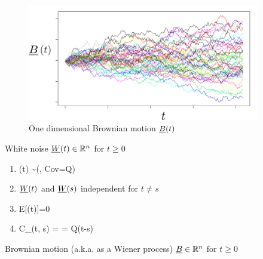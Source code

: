  \begin{figure}[h!]
  \centering
  \includegraphics[width=4in]
  {stochastic-diff-eqns/brownian-motion-labeled}
  \caption{One dimensional Brownian motion ${\underline{B}}(t)$}
  \label{fig-brownian-motion-t}
  \end{figure}
  
 

White noise ${\underline{W}}(t)
\in{ \mathbb{R}}^n$ for $t\geq 0$

\begin{enumerate}
\item
\beq
\rvW(t) \sim \caln(, Cov=Q)
\eeq

\item
${\underline{W}}(t)$ and ${\underline{W}}(s)$ independent for
$t\neq s$

\item

\beq E[\rvW(t)]=0
\eeq

\item
\beq
C_\rvW(t, s) =  = Q\delta(t-s)
\eeq



\end{enumerate}
Brownian motion (a.k.a. as a Wiener process) ${\underline{B}}\in{ \mathbb{R}}^n$
for $t\geq 0$

